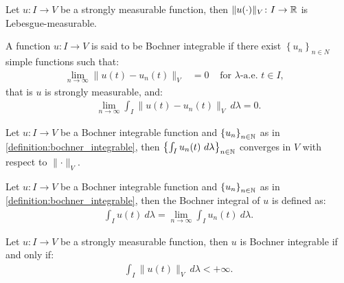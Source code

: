 \begin{lemma}
    Let $u\colon I \rightarrow V$ be a strongly measurable function, then $\lVert u(\cdot) \rVert_V \colon I \rightarrow \mathbb{R}$ is Lebesgue-measurable.
\end{lemma}

\begin{definition} \label{definition:bochner_integrable}
    A function $u\colon I \rightarrow V$ is said to be Bochner integrable if there exist $\left\{ u_n \right\}_{n \in N}$ simple functions such that:
    \begin{align}
        \lim_{n \rightarrow \infty} \lVert u(t) - u_n(t) \rVert_V &= 0 &\text{ for } \lambda \text{-a.e. } t \in I,
&    \end{align}
    that is  $u$ is strongly measurable, and:
    \begin{align}
        \lim_{n \rightarrow \infty} \int_I \lVert u(t) - u_n(t) \rVert_V ~ d \lambda = 0.
    \end{align}
\end{definition}

\begin{lemma}
    Let $u\colon I \rightarrow V$ be a Bochner integrable function and $\left\{ u_n \right\}_{n \in \mathbb{N}}$ as in \cref{definition:bochner_integrable}, then $\left\{ \int_I u_n(t) ~ d \lambda \right\}_{n \in \mathbb{N}}$ converges in $V$ with respect to $\lVert \cdot \rVert_V$.
\end{lemma}

\begin{definition}
    Let $u\colon I \rightarrow V$ be a Bochner integrable function and $\left\{ u_n \right\}_{n \in \mathbb{N}}$ as in \cref{definition:bochner_integrable}, then the Bochner integral of $u$ is defined as:
    \begin{align}
        \int_I u(t) ~ d \lambda = \lim_{n \rightarrow \infty} \int_I u_n(t) ~ d \lambda.
    \end{align}
\end{definition}

\begin{theorem}[Bochner]
    Let $u\colon I \rightarrow V$ be a strongly measurable function, then $u$ is Bochner integrable if and only if:
    \begin{align}
        \int_I \lVert u(t) \rVert_V ~ d \lambda < + \infty.
    \end{align}
\end{theorem}


